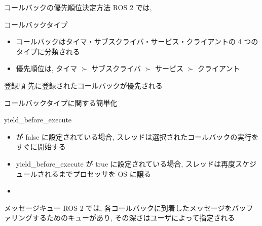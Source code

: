 \begin{frame}{コールバックの優先順位決定方法}
    ROS 2 では, 

    \begin{block}{コールバックタイプ}
        \setlength{\linewidth}{0.98\columnwidth}
        \begin{itemize}
            \item コールバックはタイマ・サブスクライバ・サービス・クライアントの 4 つのタイプに分類される
            \item 優先順位は, タイマ $\succ$ サブスクライバ $\succ$ サービス $\succ$ クライアント 
        \end{itemize}
    \end{block}

    \begin{block}{登録順}
        先に登録されたコールバックが優先される
    \end{block}
\end{frame}

\begin{frame}{コールバックタイプに関する簡単化}
\end{frame}

\begin{frame}{yield\_before\_execute}
    \begin{itemize}
        \item {} が false に設定されている場合, スレッドは選択されたコールバックの実行をすぐに開始する
        \item yield\_before\_execute が true に設定されている場合, スレッドは再度スケジュールされるまでプロセッサを OS に譲る
        \item {}
    \end{itemize}
\end{frame}

\begin{frame}{メッセージキュー}
    ROS 2 では, 各コールバックに到着したメッセージをバッファリングするためのキューがあり, その深さはユーザによって指定される
\end{frame}

